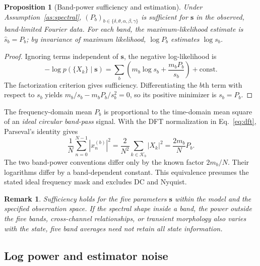 \documentclass[11pt,a4paper]{article}
\newtheorem{proposition}{Proposition}
\newtheorem{remark}{Remark}
\begin{document}
\begin{proposition}[Band-power sufficiency and estimation]\label{prop:sufficient}
Under Assumption~\ref{as:spectral}, $(P_b)_{b\in\{\delta,\theta,\alpha,\beta,\gamma\}}$
is sufficient for $\bm s$ in the observed, band-limited Fourier data. For each band,
the maximum-likelihood estimate is $\widehat{s}_b=P_b$; by invariance of maximum
likelihood, $\log P_b$ estimates $\log s_b$.
\end{proposition}
\begin{proof}
Ignoring terms independent of $\bm s$, the negative log-likelihood is
\begin{equation}
-\log p(\{X_k\}\mid\bm s)
=\sum_b\left(m_b\log s_b+\frac{m_bP_b}{s_b}\right)+\mathrm{const}.
\label{eq:likelihood}
\end{equation}
The factorization criterion gives sufficiency. Differentiating the $b$th term
with respect to $s_b$ yields
$m_b/s_b-m_bP_b/s_b^2=0$, so its positive minimizer is $s_b=P_b$.
\end{proof}

The frequency-domain mean $P_b$ is proportional to the time-domain mean square
of an \emph{ideal circular band-pass} signal. With the DFT normalization in
Eq.~\eqref{eq:dft}, Parseval's identity gives
\begin{equation}
\frac{1}{N}\sum_{n=0}^{N-1}|x^{(b)}_n|^2
=\frac{2}{N^2}\sum_{k\in\mathcal K_b}|X_k|^2
=\frac{2m_b}{N}P_b.
\label{eq:parseval}
\end{equation}
The two band-power conventions differ only by the known factor $2m_b/N$.
Their logarithms differ by a band-dependent constant. This equivalence presumes
the stated ideal frequency mask and excludes DC and Nyquist.

\begin{remark}
Sufficiency holds for the five parameters $\bm s$ \emph{within the model and the
specified observation space}. If the spectral shape inside a band, the power outside
the five bands, cross-channel relationships, or transient morphology also varies
with the state, five band averages need not retain all state information.
\end{remark}

\subsection{Log power and estimator noise}
\end{document}
